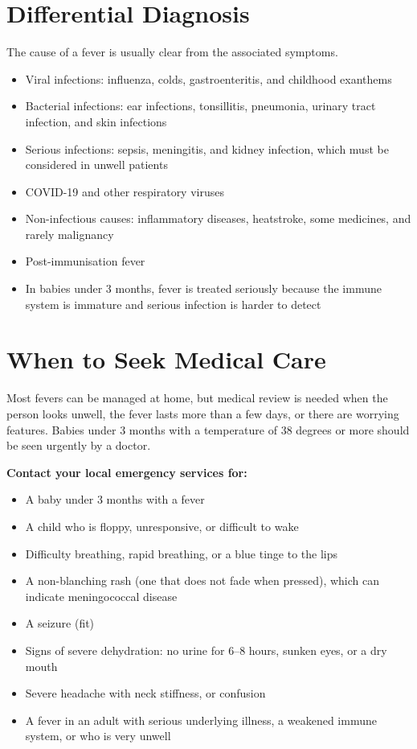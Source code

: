 \section*{Differential Diagnosis}
The cause of a fever is usually clear from the associated symptoms.
\begin{itemize}
    \item Viral infections: influenza, colds, gastroenteritis, and childhood exanthems
    \item Bacterial infections: ear infections, tonsillitis, pneumonia, urinary tract infection, and skin infections
    \item Serious infections: sepsis, meningitis, and kidney infection, which must be considered in unwell patients
    \item COVID-19 and other respiratory viruses
    \item Non-infectious causes: inflammatory diseases, heatstroke, some medicines, and rarely malignancy
    \item Post-immunisation fever
    \item In babies under 3 months, fever is treated seriously because the immune system is immature and serious infection is harder to detect
\end{itemize}

\section*{When to Seek Medical Care}
Most fevers can be managed at home, but medical review is needed when the person looks unwell, the fever lasts more than a few days, or there are worrying features. Babies under 3 months with a temperature of 38 degrees or more should be seen urgently by a doctor.

\textbf{Contact your local emergency services for:}
\begin{itemize}
    \item A baby under 3 months with a fever
    \item A child who is floppy, unresponsive, or difficult to wake
    \item Difficulty breathing, rapid breathing, or a blue tinge to the lips
    \item A non-blanching rash (one that does not fade when pressed), which can indicate meningococcal disease
    \item A seizure (fit)
    \item Signs of severe dehydration: no urine for 6--8 hours, sunken eyes, or a dry mouth
    \item Severe headache with neck stiffness, or confusion
    \item A fever in an adult with serious underlying illness, a weakened immune system, or who is very unwell
\end{itemize}

